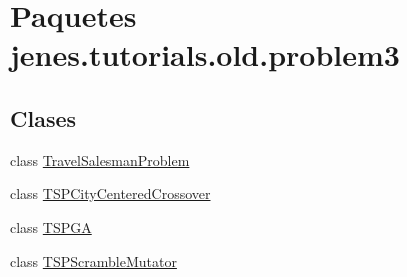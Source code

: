 \hypertarget{namespacejenes_1_1tutorials_1_1old_1_1problem3}{\section{Paquetes jenes.\-tutorials.\-old.\-problem3}
\label{namespacejenes_1_1tutorials_1_1old_1_1problem3}
}
\subsection*{Clases}
\begin{DoxyCompactItemize}
\item 
class \hyperlink{classjenes_1_1tutorials_1_1old_1_1problem3_1_1_travel_salesman_problem}{Travel\-Salesman\-Problem}
\item 
class \hyperlink{classjenes_1_1tutorials_1_1old_1_1problem3_1_1_t_s_p_city_centered_crossover}{T\-S\-P\-City\-Centered\-Crossover}
\item 
class \hyperlink{classjenes_1_1tutorials_1_1old_1_1problem3_1_1_t_s_p_g_a}{T\-S\-P\-G\-A}
\item 
class \hyperlink{classjenes_1_1tutorials_1_1old_1_1problem3_1_1_t_s_p_scramble_mutator}{T\-S\-P\-Scramble\-Mutator}
\end{DoxyCompactItemize}

